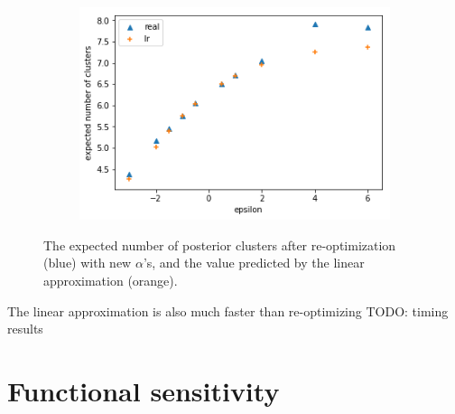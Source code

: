 \documentclass[a4paper]{article}
\begin{document}
\begin{figure}[h!]
	\centering
	\begin{subfigure}[t]{0.45\textwidth}
		\includegraphics[width = \textwidth]{./parametric_sensitivity_figs/e_num_clusters_sensitivity.png}
	\end{subfigure}
	\caption{The expected number of posterior clusters after re-optimization (blue) with new
	$\alpha$'s, and the value predicted by the linear approximation (orange). }
	\label{fig:vary_alpha_e_num_clusters}
\end{figure}


The linear approximation is also much faster than re-optimizing {\color{red} TODO: timing results}

\newpage

\section{Functional sensitivity}
\end{document}
